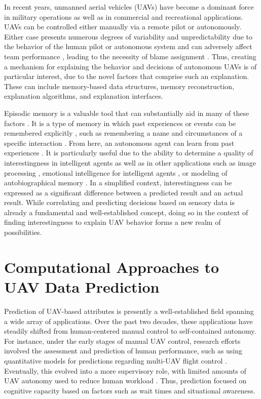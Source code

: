 \documentclass[12pt]{uthesis-v12}  %
\begin{document}
In recent years, unmanned aerial vehicles (UAVs) have become a dominant force in military operations as well as in commercial and recreational applications.
UAVs can be controlled either manually via a remote pilot or autonomously.
Either case presents numerous degrees of variability and unpredictability due to the behavior of the human pilot or autonomous system and can adversely affect team performance \cite{salas}, leading to the necessity of blame assignment \cite{malle}.
Thus, creating a mechanism for explaining the behavior and decisions of autonomous UAVs is of particular interest, due to the novel factors that comprise such an explanation. 
These can include memory-based data structures, memory reconstruction, explanation algorithms, and explanation interfaces.

Episodic memory is a valuable tool that can substantially aid in many of these factors \cite{tecuci}. It is a type of memory in which past experiences or events can be remembered explicitly \cite{wang, stach, subaj, jockel, wang2, wang4}, such as remembering a name and circumstances of a specific interaction \cite{wood}. From here, an autonomous agent can learn from past experiences \cite{kelley}.
It is particularly useful due to the ability to determine a quality of interestingness in intelligent agents \cite{kadlec,macedo,macedo2,macedo3,nuxoll} as well as in other applications such as image processing \cite{chu,derbinsky}, emotional intelligence for intelligent agents \cite{kazem}, or modeling of autobiographical memory \cite{wang3,barakova}.
In a simplified context, interestingness can be expressed as a significant difference between a predicted result and an actual result.
While correlating and predicting decisions based on sensory data \cite{javaid} is already a fundamental and well-established concept, doing so in the context of finding interestingness to explain UAV behavior forms a new realm of possibilities.

\section{Computational Approaches to UAV Data Prediction}

Prediction of UAV-based attributes is presently a well-established field spanning a wide array of applications. 
Over the past two decades, these applications have steadily shifted from human-centered manual control to self-contained autonomy.
For instance, under the early stages of manual UAV control, research efforts involved the assessment and prediction of human performance, such as using quantitative models for predictions regarding multi-UAV flight control \cite{dixon}.
Eventually, this evolved into a more supervisory role, with limited amounts of UAV autonomy used to reduce human workload \cite{cummings}.
Thus, prediction focused on cognitive capacity based on factors such as wait times and situational awareness.
\end{document}
